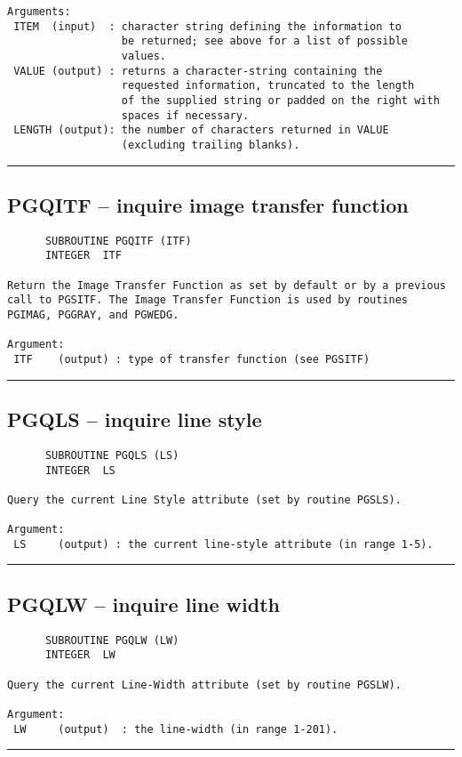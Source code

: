 {\begin{verbatim}
Arguments:
 ITEM  (input)  : character string defining the information to
                  be returned; see above for a list of possible
                  values.
 VALUE (output) : returns a character-string containing the
                  requested information, truncated to the length 
                  of the supplied string or padded on the right with 
                  spaces if necessary.
 LENGTH (output): the number of characters returned in VALUE
                  (excluding trailing blanks).
\end{verbatim}
\hrule


\subsection*{PGQITF -- inquire image transfer function }
\begin{verbatim}
      SUBROUTINE PGQITF (ITF)
      INTEGER  ITF

Return the Image Transfer Function as set by default or by a previous
call to PGSITF. The Image Transfer Function is used by routines
PGIMAG, PGGRAY, and PGWEDG.

Argument:
 ITF    (output) : type of transfer function (see PGSITF)
\end{verbatim}
\hrule


\subsection*{PGQLS -- inquire line style }
\begin{verbatim}
      SUBROUTINE PGQLS (LS)
      INTEGER  LS

Query the current Line Style attribute (set by routine PGSLS).

Argument:
 LS     (output) : the current line-style attribute (in range 1-5).
\end{verbatim}
\hrule


\subsection*{PGQLW -- inquire line width }
\begin{verbatim}
      SUBROUTINE PGQLW (LW)
      INTEGER  LW

Query the current Line-Width attribute (set by routine PGSLW).

Argument:
 LW     (output)  : the line-width (in range 1-201).
\end{verbatim}
\hrule


}
